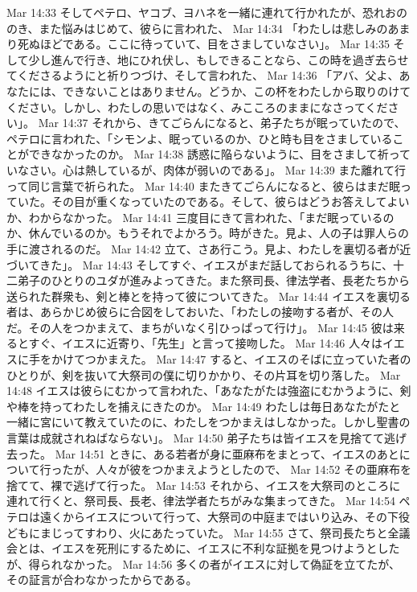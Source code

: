 Mar 14:33  そしてペテロ、ヤコブ、ヨハネを一緒に連れて行かれたが、恐れおののき、また悩みはじめて、彼らに言われた、
Mar 14:34  「わたしは悲しみのあまり死ぬほどである。ここに待っていて、目をさましていなさい」。
Mar 14:35  そして少し進んで行き、地にひれ伏し、もしできることなら、この時を過ぎ去らせてくださるようにと祈りつづけ、そして言われた、
Mar 14:36  「アバ、父よ、あなたには、できないことはありません。どうか、この杯をわたしから取りのけてください。しかし、わたしの思いではなく、みこころのままになさってください」。
Mar 14:37  それから、きてごらんになると、弟子たちが眠っていたので、ペテロに言われた、「シモンよ、眠っているのか、ひと時も目をさましていることができなかったのか。
Mar 14:38  誘惑に陥らないように、目をさまして祈っていなさい。心は熱しているが、肉体が弱いのである」。
Mar 14:39  また離れて行って同じ言葉で祈られた。
Mar 14:40  またきてごらんになると、彼らはまだ眠っていた。その目が重くなっていたのである。そして、彼らはどうお答えしてよいか、わからなかった。
Mar 14:41  三度目にきて言われた、「まだ眠っているのか、休んでいるのか。もうそれでよかろう。時がきた。見よ、人の子は罪人らの手に渡されるのだ。
Mar 14:42  立て、さあ行こう。見よ、わたしを裏切る者が近づいてきた」。
Mar 14:43  そしてすぐ、イエスがまだ話しておられるうちに、十二弟子のひとりのユダが進みよってきた。また祭司長、律法学者、長老たちから送られた群衆も、剣と棒とを持って彼についてきた。
Mar 14:44  イエスを裏切る者は、あらかじめ彼らに合図をしておいた、「わたしの接吻する者が、その人だ。その人をつかまえて、まちがいなく引ひっぱって行け」。
Mar 14:45  彼は来るとすぐ、イエスに近寄り、「先生」と言って接吻した。
Mar 14:46  人々はイエスに手をかけてつかまえた。
Mar 14:47  すると、イエスのそばに立っていた者のひとりが、剣を抜いて大祭司の僕に切りかかり、その片耳を切り落した。
Mar 14:48  イエスは彼らにむかって言われた、「あなたがたは強盗にむかうように、剣や棒を持ってわたしを捕えにきたのか。
Mar 14:49  わたしは毎日あなたがたと一緒に宮にいて教えていたのに、わたしをつかまえはしなかった。しかし聖書の言葉は成就されねばならない」。
Mar 14:50  弟子たちは皆イエスを見捨てて逃げ去った。
Mar 14:51  ときに、ある若者が身に亜麻布をまとって、イエスのあとについて行ったが、人々が彼をつかまえようとしたので、
Mar 14:52  その亜麻布を捨てて、裸で逃げて行った。
Mar 14:53  それから、イエスを大祭司のところに連れて行くと、祭司長、長老、律法学者たちがみな集まってきた。
Mar 14:54  ペテロは遠くからイエスについて行って、大祭司の中庭まではいり込み、その下役どもにまじってすわり、火にあたっていた。
Mar 14:55  さて、祭司長たちと全議会とは、イエスを死刑にするために、イエスに不利な証拠を見つけようとしたが、得られなかった。
Mar 14:56  多くの者がイエスに対して偽証を立てたが、その証言が合わなかったからである。
